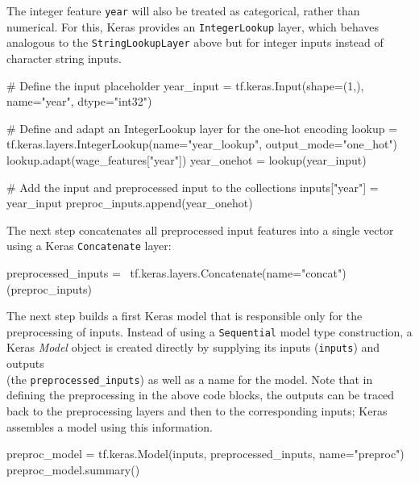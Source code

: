The integer feature \texttt{year} will also be treated as categorical, rather than numerical. For this, Keras provides an \texttt{IntegerLookup} layer, which behaves analogous to the \texttt{StringLookupLayer} above but for integer inputs instead of character string inputs.

\begin{samepage}
\begin{pythoncode}
# Define the input placeholder
year_input = tf.keras.Input(shape=(1,), name="year", dtype="int32")

# Define and adapt an IntegerLookup layer for the one-hot encoding
lookup = tf.keras.layers.IntegerLookup(name="year_lookup",
                                       output_mode="one_hot")
lookup.adapt(wage_features["year"])
year_onehot = lookup(year_input)

# Add the input and preprocessed input to the collections
inputs["year"] = year_input
preproc_inputs.append(year_onehot)
\end{pythoncode}
\end{samepage}

The next step concatenates all preprocessed input features into a single vector using a Keras \texttt{Concatenate} layer:

\begin{samepage}
\begin{pythoncode}
preprocessed_inputs = \
    tf.keras.layers.Concatenate(name="concat")(preproc_inputs)
\end{pythoncode}
\end{samepage}

The next step builds a first Keras model that is responsible only for the preprocessing of inputs. Instead of using a \texttt{Sequential} model type construction, a Keras \emph{Model} object is created directly by supplying its inputs (\texttt{inputs}) and outputs \\(the \texttt{preprocessed\_inputs}) as well as a name for the model. Note that in defining the preprocessing in the above code blocks, the outputs can be traced back to the preprocessing layers and then to the corresponding inputs; Keras assembles a model using this information.

\begin{samepage}
\begin{pythoncode}
preproc_model = tf.keras.Model(inputs, 
                               preprocessed_inputs,
                               name="preproc")
preproc_model.summary()
\end{pythoncode}
\end{samepage}

